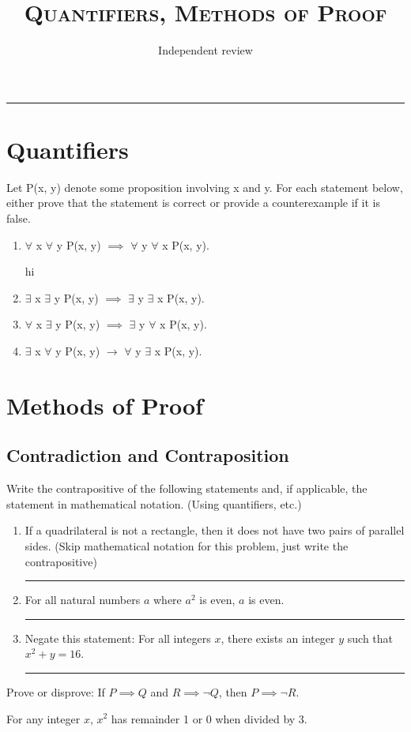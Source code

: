 \documentclass{exam}
\title{\textsc{Quantifiers, Methods of Proof}}
\date{Independent review}
\newcommand{\HRule}[1][\medskipamount]{\par
  \vspace*{\dimexpr-\parskip-\baselineskip+#1}
  \noindent\rule{\linewidth}{0.2mm}\par}
\begin{document}
\maketitle
\rule{\textwidth}{0.15em}
\fontsize{12}{15}\selectfont
\thispagestyle{empty}


\section{Quantifiers}
\begin{questions}
\item Let P(x, y) denote some proposition involving x and y. For each statement below, either prove that the statement is correct or provide a counterexample if it is false.
\begin{enumerate}[label=\alph*]
\item $\forall$ x $\forall$ y P(x, y) $\implies$ $\forall$ y $\forall$ x P(x, y).
\begin{solution}[20 mm]
hi
\end{solution}
\item $\exists$ x $\exists$ y P(x, y) $\implies$ $\exists$ y $\exists$ x P(x, y).
\vspace{20 mm}
\item $\forall$ x $\exists$ y P(x, y) $\implies$ $\exists$ y $\forall$ x P(x, y).
\vspace{20 mm}
\item $\exists$ x $\forall$ y P(x, y) $\rightarrow$ $\forall$ y $\exists$ x P(x, y).
\vspace{20 mm}
\end{enumerate}
\end{questions}
\clearpage
\section{Methods of Proof}
\subsection{Contradiction and Contraposition}
\begin{questions}
\item Write the contrapositive of the following statements and, if applicable, the statement in mathematical notation. (Using quantifiers, etc.)
\begin{enumerate}[label=\alph*]
\item If a quadrilateral is not a rectangle, then it does not have two pairs of parallel sides. (Skip mathematical notation for this problem, just write the contrapositive)
\HRule[25pt]
\item For all natural numbers $a$ where $a^2$ is even, $a$ is even.
\HRule[25pt]
\item Negate this statement: For all integers $x$, there exists an integer $y$ such that $x^2 + y = 16$.
\HRule[25pt]
\end{enumerate}
\item Prove or disprove: If $P \implies Q$ and $R \implies \lnot Q$, then $P \implies \lnot R$.
\vspace{40 mm}
\item For any integer $x$, $x^2$ has remainder 1 or 0 when divided by 3.
\end{questions}
\clearpage
\end{document}
